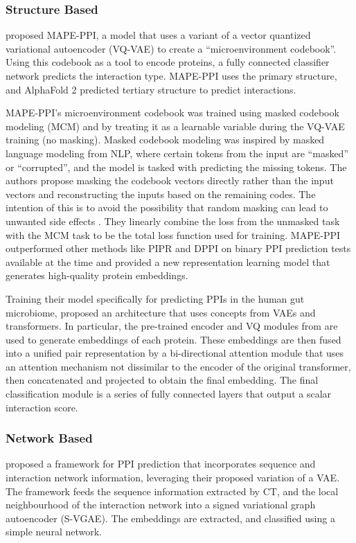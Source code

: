 \documentclass{article}
\begin{document}
\subsubsection{Structure Based}
\citet{wu_mape-ppi_2024} proposed MAPE-PPI, a model that uses a variant of a vector quantized variational autoencoder (VQ-VAE) to create a ``microenvironment codebook''. Using this codebook as a tool to encode proteins, a fully connected classifier network predicts the interaction type. MAPE-PPI uses the primary structure, and AlphaFold 2 predicted tertiary structure to predict interactions.

MAPE-PPI's microenvironment codebook was trained using masked codebook modeling (MCM) and by treating it as a learnable variable during the VQ-VAE training (no masking). Masked codebook modeling was inspired by masked language modeling from NLP, where certain tokens from the input are ``masked'' or ``corrupted'', and the model is tasked with predicting the missing tokens. The authors propose masking the codebook vectors directly rather than the input vectors and reconstructing the inputs based on the remaining codes. The intention of this is to avoid the possibility that random masking can lead to unwanted side effects \citep{pmlr-v162-shi22d, li_semmae_2022}. They linearly combine the loss from the unmasked task with the MCM task to be the total loss function used for training. MAPE-PPI outperformed other methods like PIPR \citep{chen_multifaceted_2019} and DPPI \citep{hashemifar_predicting_2018} on binary PPI prediction tests available at the time and provided a new representation learning model that generates high-quality protein embeddings.

Training their model specifically for predicting PPIs in the human gut microbiome, \citet{kiouri_structure-based_gut_2025} proposed an architecture that uses concepts from VAEs and transformers. In particular, the pre-trained encoder and VQ modules from \citep{wu_mape-ppi_2024} are used to generate embeddings of each protein. These embeddings are then fused into a unified pair representation by a bi-directional attention module that uses an attention mechanism not dissimilar to the encoder of the original transformer, then concatenated and projected to obtain the final embedding. The final classification module is a series of fully connected layers that output a scalar interaction score.

\subsubsection{Network Based}
\citet{yang_graph-based_2020} proposed a framework for PPI prediction that incorporates sequence and interaction network information, leveraging their proposed variation of a VAE. The framework feeds the sequence information extracted by CT, and the local neighbourhood of the interaction network into a signed variational graph autoencoder (S-VGAE). The embeddings are extracted, and classified using a simple neural network.
\end{document}
